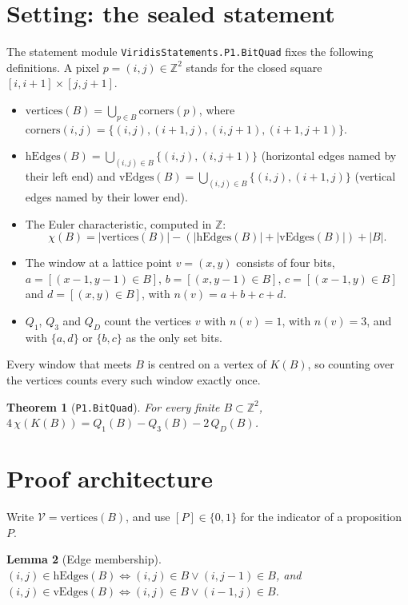 \documentclass[11pt]{article}
\newtheorem{theorem}{Theorem}
\newtheorem{lemma}[theorem]{Lemma}
\theoremstyle{definition}
\theoremstyle{remark}
\begin{document}
\section{Setting: the sealed statement}\label{sec:l1start}

The statement module \texttt{ViridisStatements.P1.BitQuad} fixes the following
definitions. A pixel $p=(i,j)\in\mathbb{Z}^2$ stands for the closed square
$[i,i+1]\times[j,j+1]$.
\begin{itemize}
\item $\mathrm{vertices}(B)=\bigcup_{p\in B}\mathrm{corners}(p)$, where
  $\mathrm{corners}(i,j)=\{(i,j),(i+1,j),(i,j+1),(i+1,j+1)\}$.
\item $\mathrm{hEdges}(B)=\bigcup_{(i,j)\in B}\{(i,j),(i,j+1)\}$ (horizontal
  edges named by their left end) and
  $\mathrm{vEdges}(B)=\bigcup_{(i,j)\in B}\{(i,j),(i+1,j)\}$ (vertical edges named
  by their lower end).
\item The Euler characteristic, computed in $\mathbb{Z}$:
  \[\chi(B) = |\mathrm{vertices}(B)| - (|\mathrm{hEdges}(B)|+|\mathrm{vEdges}(B)|) + |B|.\]
\item The window at a lattice point $v=(x,y)$ consists of four bits,
  $a=[(x-1,y-1)\in B]$, $b=[(x,y-1)\in B]$, $c=[(x-1,y)\in B]$ and
  $d=[(x,y)\in B]$, with $n(v)=a+b+c+d$.
\item $Q_1$, $Q_3$ and $Q_D$ count the vertices $v$ with $n(v)=1$, with
  $n(v)=3$, and with $\{a,d\}$ or $\{b,c\}$ as the only set bits.
\end{itemize}
Every window that meets $B$ is centred on a vertex of $K(B)$, so counting over
the vertices counts every such window exactly once.

\begin{theorem}[\texttt{P1.BitQuad}]\label{thm:main}
For every finite $B\subset\mathbb{Z}^2$,
$4\,\chi(K(B)) = Q_1(B) - Q_3(B) - 2\,Q_D(B)$.
\end{theorem}

\section{Proof architecture}

Write $\mathcal V=\mathrm{vertices}(B)$, and use $[P]\in\{0,1\}$ for the indicator
of a proposition $P$.

\begin{lemma}[Edge membership]\label{lem:edges}
$(i,j)\in\mathrm{hEdges}(B) \iff (i,j)\in B \lor (i,j-1)\in B$, and
$(i,j)\in\mathrm{vEdges}(B) \iff (i,j)\in B \lor (i-1,j)\in B$.
\end{lemma}
\end{document}
